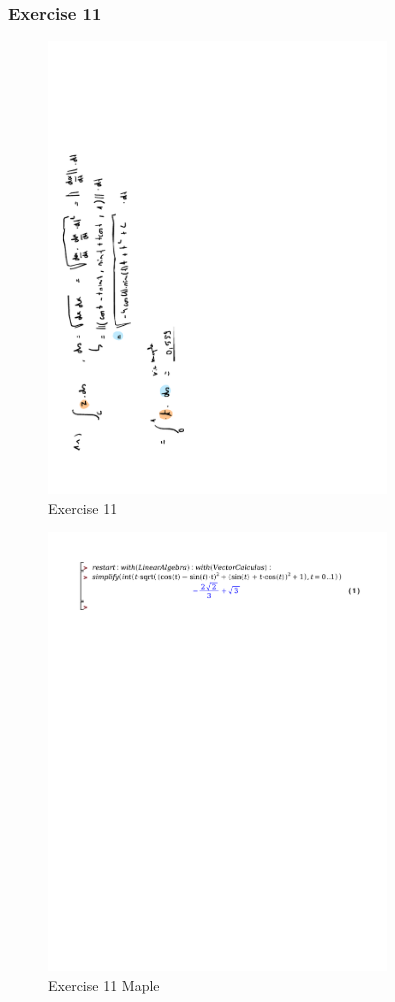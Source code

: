 \documentclass[a4paper]{report}
\begin{document}
\subsubsection{Exercise 11}

\begin{figure}[H]
	\centering
	\includegraphics[angle=-90, width=0.8\textwidth]{assets/huis_6_ex_11.pdf}
	\caption{Exercise 11}
\end{figure}

\begin{figure}[H]
	\centering
	\includegraphics[width=0.8\textwidth]{exercises/huis_6_ex_11.pdf}
	\caption{Exercise 11 Maple}
\end{figure}
\end{document}

